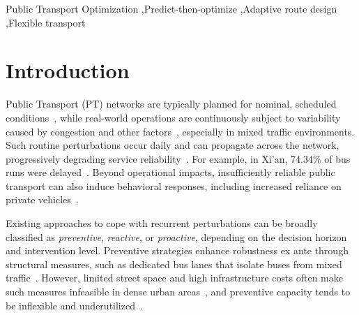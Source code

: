 \documentclass[a4paper,fleqn]{cas-sc}
\begin{document}

\begin{highlights}
\item 
\item 
\item 
\end{highlights}


\begin{keywords}
Public Transport Optimization \sep Predict-then-optimize \sep Adaptive route design \sep Flexible transport
\end{keywords}

\maketitle

\section{Introduction}

Public Transport (PT) networks are typically planned for nominal, scheduled conditions~\citep{ibarra2015planning}, while real-world operations are continuously subject to variability caused by congestion and other factors~\citep{buchel2020review, danaher2020minutes}, especially in mixed traffic environments. Such routine perturbations occur daily and can propagate across the network, progressively degrading service reliability~\citep{marra2020delay}. For example, in Xi’an, 74.34\% of bus runs were delayed~\citep{zhang2022travel}. 
Beyond operational impacts, insufficiently reliable public transport can also induce behavioral responses, including increased reliance on private vehicles~\citep{rodier2025evaluation}.

Existing approaches to cope with recurrent perturbations can be broadly classified as \emph{preventive}, \emph{reactive}, or \emph{proactive}, depending on the decision horizon and intervention level. 
Preventive strategies enhance robustness ex ante through structural measures, such as dedicated bus lanes that isolate buses from mixed traffic~\citep{russo2022dedicated}. 
However, limited street space and high infrastructure costs often make such measures infeasible in dense urban areas~\citep{li2009evaluation}, and preventive capacity tends to be inflexible and underutilized~\citep{ITF2024, ITF2025}.
\end{document}
